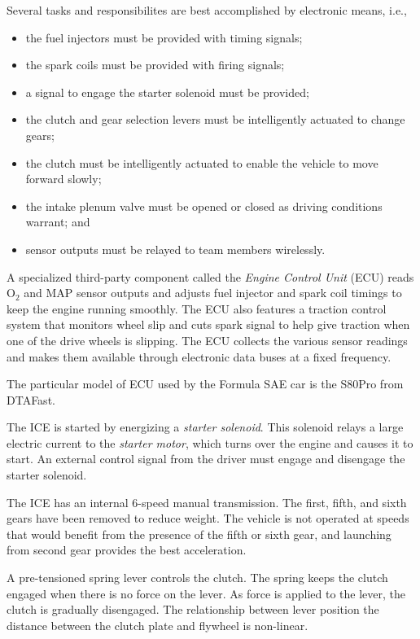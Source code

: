 Several tasks and responsibilites are best accomplished by electronic means, i.e.,

\begin{itemize}
\item the fuel injectors must be provided with timing signals;
\item the spark coils must be provided with firing signals;
\item a signal to engage the starter solenoid must be provided;
\item the clutch and gear selection levers must be intelligently actuated to change gears; 
\item the clutch must be intelligently actuated to enable the vehicle to move forward slowly;
\item the intake plenum valve must be opened or closed as driving conditions warrant; and
\item sensor outputs must be relayed to team members wirelessly.
\end{itemize}

A specialized third-party component called the \emph{Engine Control Unit} (ECU) reads O$_{2}$
and MAP sensor outputs and adjusts fuel injector and spark coil timings to keep the engine running 
smoothly. The ECU also features a traction control system that monitors wheel slip and cuts spark 
signal to help give traction when one of the drive wheels is slipping. The ECU collects the various 
sensor readings and makes them available through electronic data buses at a fixed frequency. 

The particular model of ECU used by the Formula SAE car is the S80Pro from DTAFast\cite{s60pro}.

The ICE is started by energizing a \emph{starter solenoid}. This solenoid relays a large electric 
current to the \emph{starter motor}, which turns over the engine and causes it to start. An 
external control signal from the driver must engage and disengage the starter solenoid.

The ICE has an internal 6-speed manual transmission. The first, fifth, and sixth gears have been 
removed to reduce weight. The vehicle is not operated at speeds that would benefit from the presence 
of the fifth or sixth gear, and launching from second gear provides the best acceleration. 

A pre-tensioned spring lever controls the clutch. The spring keeps the clutch engaged when there is 
no force on the lever. As force is applied to the lever, the clutch is gradually disengaged. The 
relationship between lever position the distance between the clutch plate and flywheel is non-linear. 

